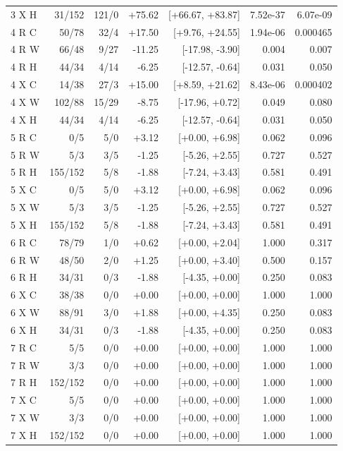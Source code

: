 {\begin{longtable}{lrrrrrr}
3 X H & 31/152 & 121/0 & +75.62 & [+66.67, +83.87] & 7.52e-37 & 6.07e-09\\
4 R C & 50/78 & 32/4 & +17.50 & [+9.76, +24.55] & 1.94e-06 & 0.000465\\
4 R W & 66/48 & 9/27 & -11.25 & [-17.98, -3.90] & 0.004 & 0.007\\
4 R H & 44/34 & 4/14 & -6.25 & [-12.57, -0.64] & 0.031 & 0.050\\
4 X C & 14/38 & 27/3 & +15.00 & [+8.59, +21.62] & 8.43e-06 & 0.000402\\
4 X W & 102/88 & 15/29 & -8.75 & [-17.96, +0.72] & 0.049 & 0.080\\
4 X H & 44/34 & 4/14 & -6.25 & [-12.57, -0.64] & 0.031 & 0.050\\
5 R C & 0/5 & 5/0 & +3.12 & [+0.00, +6.98] & 0.062 & 0.096\\
5 R W & 5/3 & 3/5 & -1.25 & [-5.26, +2.55] & 0.727 & 0.527\\
5 R H & 155/152 & 5/8 & -1.88 & [-7.24, +3.43] & 0.581 & 0.491\\
5 X C & 0/5 & 5/0 & +3.12 & [+0.00, +6.98] & 0.062 & 0.096\\
5 X W & 5/3 & 3/5 & -1.25 & [-5.26, +2.55] & 0.727 & 0.527\\
5 X H & 155/152 & 5/8 & -1.88 & [-7.24, +3.43] & 0.581 & 0.491\\
6 R C & 78/79 & 1/0 & +0.62 & [+0.00, +2.04] & 1.000 & 0.317\\
6 R W & 48/50 & 2/0 & +1.25 & [+0.00, +3.40] & 0.500 & 0.157\\
6 R H & 34/31 & 0/3 & -1.88 & [-4.35, +0.00] & 0.250 & 0.083\\
6 X C & 38/38 & 0/0 & +0.00 & [+0.00, +0.00] & 1.000 & 1.000\\
6 X W & 88/91 & 3/0 & +1.88 & [+0.00, +4.35] & 0.250 & 0.083\\
6 X H & 34/31 & 0/3 & -1.88 & [-4.35, +0.00] & 0.250 & 0.083\\
7 R C & 5/5 & 0/0 & +0.00 & [+0.00, +0.00] & 1.000 & 1.000\\
7 R W & 3/3 & 0/0 & +0.00 & [+0.00, +0.00] & 1.000 & 1.000\\
7 R H & 152/152 & 0/0 & +0.00 & [+0.00, +0.00] & 1.000 & 1.000\\
7 X C & 5/5 & 0/0 & +0.00 & [+0.00, +0.00] & 1.000 & 1.000\\
7 X W & 3/3 & 0/0 & +0.00 & [+0.00, +0.00] & 1.000 & 1.000\\
7 X H & 152/152 & 0/0 & +0.00 & [+0.00, +0.00] & 1.000 & 1.000\\
\bottomrule\end{longtable}}